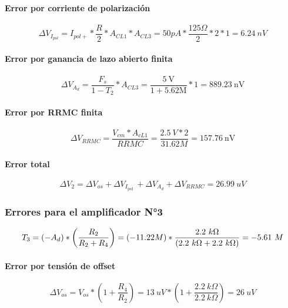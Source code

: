 \paragraph{Error por corriente de polarización}
    \begin{equation*}
        \Delta V_{I_{p o l}}=I_{p o l+} * \frac{R}{2} * A_{C L 1} * A_{C L 3}=50 p A * \frac{125 \Omega}{2} * 2 *1=6.24 ~n V
    \end{equation*}
\paragraph{Error por ganancia de lazo abierto finita}
    \begin{equation*}
        \Delta V_{A_d}=\frac{F_s}{1-T_2} * A_{C L 3}=\frac{5 \mathrm{~V}}{1+5.62 \mathrm{M}} * 1=889.23~ \mathrm{nV}
    \end{equation*}
\paragraph{Error por RRMC finita}
    \begin{equation*}
        \Delta V_{R R M C}=\frac{V_{c m} * A_{c L 1}}{R R M C}=\frac{2.5~ V * 2}{31.62 M}=157.76 ~\mathrm{nV}
    \end{equation*}    
\paragraph{Error total}
    \begin{equation*}
            \Delta V_2=\Delta V_{o s}+\Delta V_{I_{\text {pol }}}+\Delta V_{A_d}+\Delta V_{R R M C} = 26.99 ~u V
    \end{equation*}
\subsubsection{Errores para el amplificador N°3}
\begin{equation*}
        T_3=\left(-A_d\right) *\left(\frac{R_2}{R_2+R_4}\right)=(-11.22 M) * \frac{2.2~ k \Omega}{(2.2~ k \Omega+2.2~ k \Omega)}=-5.61 ~M \\
\end{equation*}
\paragraph{Error por tensión de offset}
\begin{equation*}
    \Delta V_{o s}=V_{o s} *\left(1+\frac{R_4}{R_2}\right)=13 ~u V *\left(1+\frac{2.2 ~k \Omega}{2.2 ~k \Omega}\right)=26 ~u V
\end{equation*}
